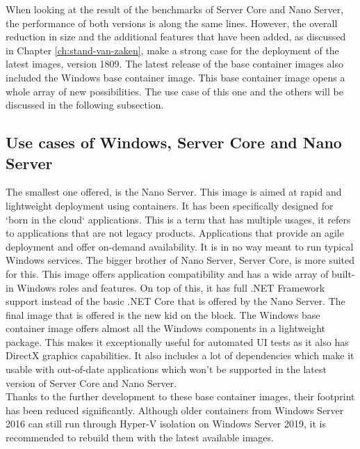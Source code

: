  When looking at the result of the benchmarks of Server Core and Nano Server, the performance of both versions is along the same lines. 
 However, the overall reduction in size and the additional features that have been added, as discussed in Chapter \ref{ch:stand-van-zaken}, make a strong case for the deployment of the latest images, version 1809. 
 The latest release of the base container images also included the Windows base container image. 
 This base container image opens a whole array of new possibilities. 
 The use case of this one and the others will be discussed in the following subsection.

\subsection{Use cases of Windows, Server Core and Nano Server}
The smallest one offered, is the Nano Server. 
This image is aimed at rapid and lightweight deployment using containers. 
It has been specifically designed for `born in the cloud` applications. 
This is a term that has multiple usages, it refers to applications that are not legacy products. 
Applications that provide an agile deployment and offer on-demand availability. 
It is in no way meant to run typical Windows services. 
The bigger brother of Nano Server, Server Core, is more suited for this. 
This image offers application compatibility and has a wide array of built-in Windows roles and features. 
On top of this, it has full .NET Framework support instead of the basic .NET Core that is offered by the Nano Server. 
The final image that is offered is the new kid on the block. 
The Windows base container image offers almost all the Windows components in a lightweight package. 
This makes it exceptionally useful for automated UI tests as it also has DirectX graphics capabilities. 
It also includes a lot of dependencies which make it usable with out-of-date applications which won't be supported in the latest version of Server Core and Nano Server. 
\\
Thanks to the further development to these base container images, their footprint has been reduced significantly. 
Although older containers from Windows Server 2016 can still run through Hyper-V isolation on Windows Server 2019, it is recommended to rebuild them with the latest available images.




